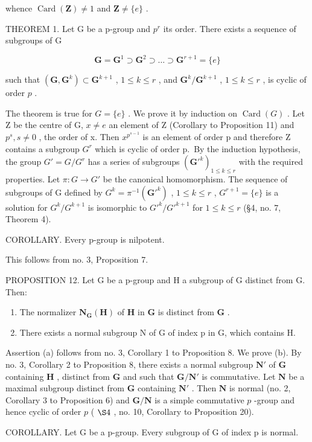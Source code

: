 whence \(\operatorname{Card}(\mathbf{Z}) \neq 1\) and \(\mathbf{Z} \neq \{e\}\) .

THEOREM 1. Let G be a p-group and \(p^{r}\) its order. There exists a sequence of subgroups of G

\[
\mathbf {G} = \mathbf {G} ^ {1} \supset \mathbf {G} ^ {2} \supset \dots \supset \mathbf {G} ^ {r + 1} = \{e \}
\]

such that \((\mathbf{G},\mathbf{G}^k)\subset \mathbf{G}^{k + 1}\) , \(1\leqslant k\leqslant r\) , and \(\mathbf{G}^k /\mathbf{G}^{k + 1}\) , \(1\leqslant k\leqslant r\) , is cyclic of order \(p\) .

The theorem is true for \(G = \{e\}\) . We prove it by induction on \(\operatorname{Card}(G)\) . Let Z be the centre of G, \(x \neq e\) an element of Z (Corollary to Proposition 11) and \(p^{s}, s \neq 0\) , the order of x. Then \(x^{p^{s-1}}\) is an element of order p and therefore Z contains a subgroup \(G^{r}\) which is cyclic of order p.~By the induction hypothesis, the group \(G' = G/G^{r}\) has a series of subgroups \((\mathbf{G}'^{k})_{1 \leqslant k \leqslant r}\) with the required properties. Let \(\pi: G \to G'\) be the canonical homomorphism. The sequence of subgroups of G defined by \(G^{k} = \pi^{-1}(\mathbf{G}'^{k})\) , \(1 \leqslant k \leqslant r\) , \(G^{r+1} = \{e\}\) is a solution for \(G^{k}/G^{k+1}\) is isomorphic to \(G'^{k}/G'^{k+1}\) for \(1 \leqslant k \leqslant r\) (§4, no. 7, Theorem 4).

COROLLARY. Every p-group is nilpotent.

This follows from no. 3, Proposition 7.

PROPOSITION 12. Let G be a p-group and H a subgroup of G distinct from G. Then:

\begin{enumerate}
\def\labelenumi{(\alph{enumi})}
\item
  The normalizer \(\mathbf{N}_{\mathbf{G}}(\mathbf{H})\) of \(\mathbf{H}\) in \(\mathbf{G}\) is distinct from \(\mathbf{G}\) .
\item
  There exists a normal subgroup N of G of index p in G, which contains H.
\end{enumerate}

Assertion (a) follows from no. 3, Corollary 1 to Proposition 8. We prove (b). By no. 3, Corollary 2 to Proposition 8, there exists a normal subgroup \(\mathbf{N}'\) of \(\mathbf{G}\) containing \(\mathbf{H}\) , distinct from \(\mathbf{G}\) and such that \(\mathbf{G} / \mathbf{N}'\) is commutative. Let \(\mathbf{N}\) be a maximal subgroup distinct from \(\mathbf{G}\) containing \(\mathbf{N}'\) . Then \(\mathbf{N}\) is normal (no. 2, Corollary 3 to Proposition 6) and \(\mathbf{G} / \mathbf{N}\) is a simple commutative \(p\) -group and hence cyclic of order \(p\) ( \(\S 4\) , no. 10, Corollary to Proposition 20).

COROLLARY. Let G be a p-group. Every subgroup of G of index p is normal.

